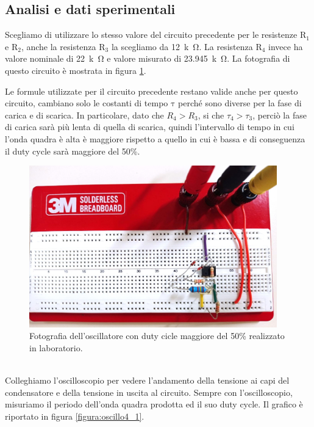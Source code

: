 \documentclass{report}
\begin{document}
\subsection{Analisi e dati sperimentali}
Scegliamo di utilizzare lo stesso valore del circuito precedente per le resistenze $\mathrm{R_1}$ e $\mathrm{R_2}$, anche la resistenza $\mathrm{R_3}$ la scegliamo da \SI{12}{k\ohm}. La resistenza $\mathrm{R_4}$ invece ha valore nominale di \SI{22}{k\ohm} e valore misurato di \SI{23.945}{k\ohm}. La fotografia di questo circuito è mostrata in figura \ref{figura:circuito4_1}.\par
Le formule utilizzate per il circuito precedente restano valide anche per questo circuito, cambiano solo le costanti di tempo $\mathrm{\tau}$ perché sono diverse per la fase di carica e di scarica. In particolare, dato che $\displaystyle{R_4>R_3}$, si che $\displaystyle{\tau_4>\tau_3}$, perciò la fase di carica sarà più lenta di quella di scarica, quindi l'intervallo di tempo in cui l'onda quadra è alta è maggiore rispetto a quello in cui è bassa e di conseguenza il duty cycle sarà maggiore del 50\%.
\begin{figure}[h!]
	\centering
	\includegraphics[height=7cm]{immagini/circuito4_1.jpg}
	\caption{Fotografia dell'oscillatore con duty cicle maggiore del 50\% realizzato in laboratorio.}
	\label{figura:circuito4_1}
\end{figure}
\\Colleghiamo l'oscilloscopio per vedere l'andamento della tensione ai capi del condensatore e della tensione in uscita al circuito. Sempre con l'oscilloscopio, misuriamo il periodo dell'onda quadra prodotta ed il suo duty cycle. Il grafico è riportato in figura \ref{figura:oscillo4_1}.\par
\end{document}
